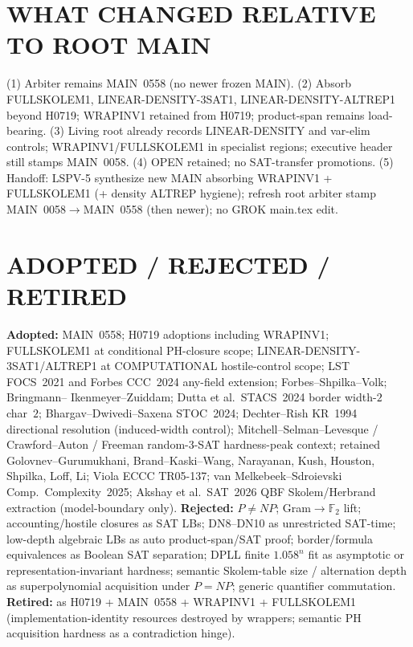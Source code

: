 \documentclass[11pt]{article}
\begin{document}
\section*{WHAT CHANGED RELATIVE TO ROOT MAIN}
(1) Arbiter remains MAIN~0558 (no newer frozen MAIN). (2) Absorb FULLSKOLEM1,
LINEAR-DENSITY-3SAT1, LINEAR-DENSITY-ALTREP1 beyond H0719; WRAPINV1 retained from H0719;
product-span remains load-bearing. (3) Living root already records LINEAR-DENSITY and
var-elim controls; WRAPINV1/FULLSKOLEM1 in specialist regions; executive header still stamps
MAIN~0058. (4) OPEN retained; no SAT-transfer promotions. (5) Handoff: LSPV-5 synthesize new
MAIN absorbing WRAPINV1 + FULLSKOLEM1 (+ density ALTREP hygiene); refresh root arbiter stamp
MAIN~0058$\to$MAIN~0558 (then newer); no GROK main.tex edit.

\section*{ADOPTED / REJECTED / RETIRED}
\textbf{Adopted:} MAIN~0558; H0719 adoptions including WRAPINV1; FULLSKOLEM1 at conditional
PH-closure scope; LINEAR-DENSITY-3SAT1/ALTREP1 at COMPUTATIONAL hostile-control scope;
LST FOCS~2021 and Forbes CCC~2024 any-field extension; Forbes--Shpilka--Volk; Bringmann--
Ikenmeyer--Zuiddam; Dutta et al.\ STACS~2024 border width-$2$ char~$2$; Bhargav--Dwivedi--Saxena
STOC~2024; Dechter--Rish KR~1994 directional resolution (induced-width control);
Mitchell--Selman--Levesque / Crawford--Auton / Freeman random-3-SAT hardness-peak context;
retained Golovnev--Gurumukhani, Brand--Kaski--Wang, Narayanan, Kush, Houston, Shpilka, Loff, Li;
Viola ECCC TR05-137; van Melkebeek--Sdroievski Comp.\ Complexity~2025; Akshay et al.\ SAT~2026
QBF Skolem/Herbrand extraction (model-boundary only).
\textbf{Rejected:} $P\neq NP$; Gram$\to\mathbb F_2$ lift; accounting/hostile closures as SAT LBs;
DN8--DN10 as unrestricted SAT-time; low-depth algebraic LBs as auto product-span/SAT proof;
border/formula equivalences as Boolean SAT separation; DPLL finite $1.058^n$ fit as asymptotic
or representation-invariant hardness; semantic Skolem-table size / alternation depth as
superpolynomial acquisition under $P=NP$; generic quantifier commutation.
\textbf{Retired:} as H0719 + MAIN~0558 + WRAPINV1 + FULLSKOLEM1 (implementation-identity
resources destroyed by wrappers; semantic PH acquisition hardness as a contradiction hinge).
\end{document}
